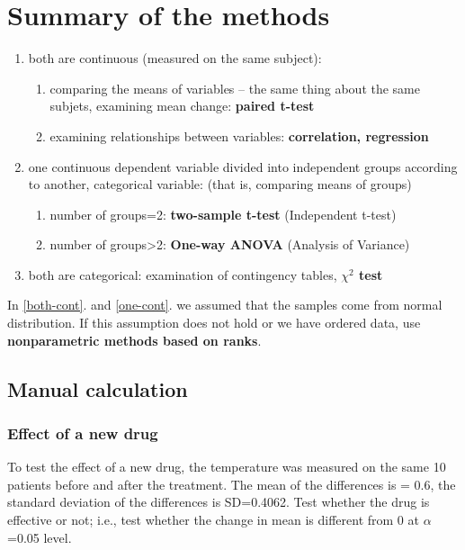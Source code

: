 \chapter{Summary of the methods}

\begin{enumerate}
\item\label{both-cont}
 both are continuous (measured on the same subject):
 
 	\begin{enumerate}
	\item comparing the means of variables – the same thing about the same subjets, examining mean change: \textbf{paired t-test}
	\item  examining relationships between variables: \textbf{correlation, regression}
	\end{enumerate}
\item\label{one-cont} one continuous dependent variable divided into independent groups according to another, categorical variable: (that is, comparing means of groups)

	\begin{enumerate}
	\item number of groups=2: \textbf{two-sample t-test} (Independent t-test)
	\item number of groups>2: \textbf{One-way ANOVA} (Analysis of Variance)
	\end{enumerate}
\item both are categorical: examination of contingency tables, \textbf{$\chi^2$ test}
\end{enumerate}

\noindent In \ref{both-cont}. and \ref{one-cont}. we assumed that the samples come from normal distribution. If this assumption does not hold or we have ordered data, use \textbf{nonparametric methods based on ranks}.

\vfill
\section{Manual calculation}

\subsection{Effect of a new drug}
To test the effect of a new drug, the temperature was measured on the same 10 patients before and after the treatment. The mean of the differences is = 0.6, the standard deviation of the differences is SD=0.4062. Test whether the drug is effective or not; i.e., test whether the change in mean is different from 0 at $\alpha$=0.05 level.

